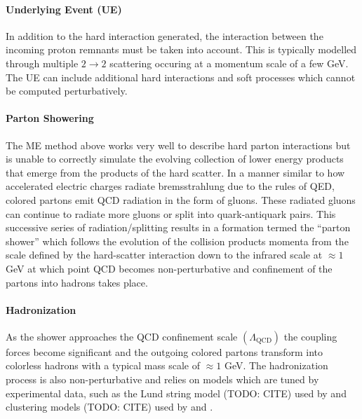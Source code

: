\paragraph{\textbf{Underlying Event (UE)}}
In addition to the hard interaction generated, the interaction between the incoming proton remnants must be taken into account.
This is typically modelled through multiple $2 \rightarrow 2$ scattering occuring at a momentum scale of a few GeV.
The UE can include additional hard interactions and soft processes which cannot be computed perturbatively.

\paragraph{\textbf{Parton Showering}}
The ME method above works very well to describe hard parton interactions but is unable to correctly simulate the evolving collection of lower energy products that emerge from the products of the hard scatter.
In a manner similar to how accelerated electric charges radiate bremsstrahlung due to the rules of QED, colored partons emit QCD radiation in the form of gluons.
These radiated gluons can continue to radiate more gluons or split into quark-antiquark pairs.
This successive series of radiation/splitting results in a formation termed the ``parton shower'' which follows the evolution of the collision products momenta from the scale defined by the hard-scatter interaction down to the infrared scale at $\approx 1$ GeV at which point QCD becomes non-perturbative and confinement of the partons into hadrons takes place.

\paragraph{\textbf{Hadronization}}
As the shower approaches the QCD confinement scale $(\Lambda_{\mathrm{QCD}})$ the coupling forces become significant and the outgoing colored partons transform into colorless hadrons with a typical mass scale of $\approx 1$ GeV.
The hadronization process is also non-perturbative and relies on models which are tuned by experimental data, such as the Lund string model (TODO: CITE) used by \Pythia and clustering models (TODO: CITE) used by \Herwig and \Sherpa.

